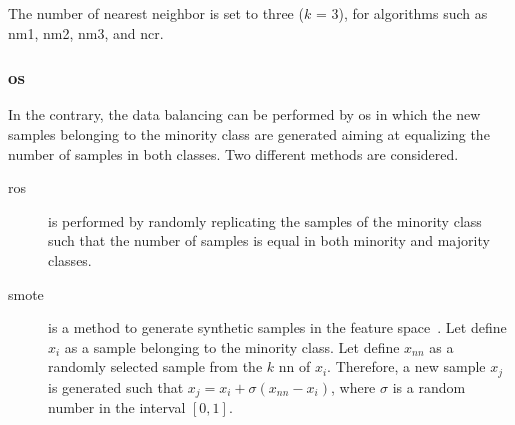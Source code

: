 The number of nearest neighbor is set to three ($k$ = 3), for algorithms such as \ac{nm1}, \ac{nm2}, \ac{nm3}, and \ac{ncr}.
\subsubsection{\acl{os}}

\noindent In the contrary, the data balancing can be performed by \ac{os} in which the new samples belonging to the minority class are generated aiming at equalizing the number of samples in both classes.
Two different methods are considered.

\begin{description}
\item[\Ac{ros}] is performed by randomly replicating the samples of the minority class such that the number of samples is equal in both minority and majority classes.
\end{description}



\begin{description}
\item[\Ac{smote}] is a method to generate synthetic samples in the feature space~\cite{chawla2002smote}.
Let define $x_i$ as a sample belonging to the minority class.
Let define $x_{nn}$ as a randomly selected sample from the $k$ \ac{nn} of $x_i$.
Therefore, a new sample $x_j$ is generated such that $x_j = x_i + \sigma \left( x_{nn} - x_i \right)$, where $\sigma$ is a random number in the interval $\left[0,1\right]$.
\end{description}

